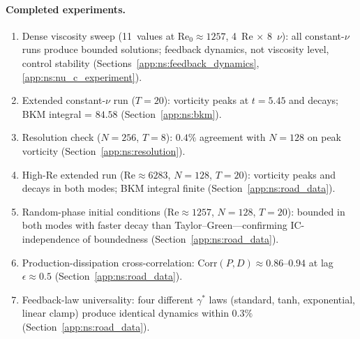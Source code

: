 \paragraph{Completed experiments.}
\begin{enumerate}
\item Dense viscosity sweep (11~values at $\mathrm{Re}_0
  \approx 1257$, 4~Re $\times$ 8~$\nu$):
  all constant-$\nu$ runs produce bounded solutions;
  feedback dynamics, not viscosity level, control
  stability (Sections~\ref{app:ns:feedback_dynamics},
  \ref{app:ns:nu_c_experiment}).

\item Extended constant-$\nu$ run ($T=20$): vorticity
  peaks at $t = 5.45$ and decays; BKM integral = $84.58$
  (Section~\ref{app:ns:bkm}).

\item Resolution check ($N = 256$, $T = 8$): $0.4\%$
  agreement with $N=128$ on peak vorticity
  (Section~\ref{app:ns:resolution}).

\item High-Re extended run ($\mathrm{Re} \approx 6283$,
  $N=128$, $T=20$): vorticity peaks and decays in both
  modes; BKM integral finite
  (Section~\ref{app:ns:road_data}).

\item Random-phase initial conditions ($\mathrm{Re}
  \approx 1257$, $N=128$, $T=20$): bounded in both
  modes with faster decay than Taylor--Green---confirming
  IC-independence of boundedness
  (Section~\ref{app:ns:road_data}).

\item Production-dissipation cross-correlation:
  $\mathrm{Corr}(P,D) \approx 0.86$--$0.94$ at lag
  $\epsilon \approx 0.5$
  (Section~\ref{app:ns:road_data}).

\item Feedback-law universality: four different $\gamma^*$
  laws (standard, tanh, exponential, linear clamp) produce
  identical dynamics within $0.3\%$
  (Section~\ref{app:ns:road_data}).
\end{enumerate}

